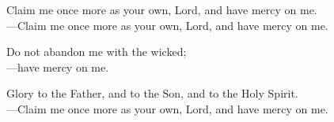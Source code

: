 \responsory

\noindent Claim me once more as your own, Lord, and have mercy on me.\\
{\color{red}---\thinspace}Claim me once more as your own, Lord, and have mercy on me.

\medskip\noindent Do not abandon me with the wicked;\\
{\color{red}---\thinspace}have mercy on me.

\medskip\noindent Glory to the Father, and to the Son, and to the Holy Spirit.\\
{\color{red}---\thinspace}Claim me once more as your own, Lord, and have mercy on me.